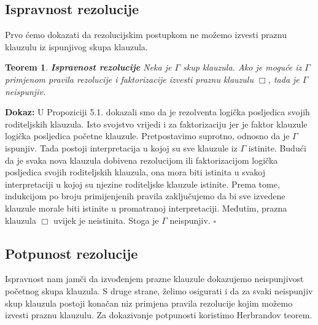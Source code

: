 \documentclass{article}
\theoremstyle{definition}
\theoremstyle{plain}
\newtheorem{teo}{Teorem}[section]
\begin{document}
\subsection*{Ispravnost rezolucije}
Prvo ćemo dokazati da rezolucijskim postupkom ne možemo izvesti praznu klauzulu iz ispunjivog skupa klauzula.

\begin{teo} \textbf{Ispravnost rezolucije}\newline
Neka je $\Gamma$ skup klauzula. Ako je moguće iz $\Gamma$ primjenom pravila rezolucije i faktorizacije izvesti praznu klauzulu $\Box$, tada je $\Gamma$ neispunjiv.
\end{teo}

\textbf{Dokaz:}\newline
U Propoziciji 5.1. dokazali smo da je rezolventa logička posljedica svojih roditeljskih klauzula. Isto svojstvo vrijedi i za faktorizaciju jer je faktor klauzule logička posljedica početne klauzule.
Pretpostavimo suprotno, odnosno da je $\Gamma$ ispunjiv. Tada postoji interpretacija u kojoj su sve klauzule iz $\Gamma$ istinite.
Budući da je svaka nova klauzula dobivena rezolucijom ili faktorizacijom logička posljedica svojih roditeljskih klauzula, ona mora biti istinita u svakoj interpretaciji u kojoj su njezine roditeljske klauzule istinite.
Prema tome, indukcijom po broju primijenjenih pravila zaključujemo da bi sve izvedene klauzule morale biti istinite u promatranoj interpretaciji.
Međutim, prazna klauzula $\Box$ uvijek je neistinita.
Stoga je $\Gamma$ neispunjiv. $\square$

\subsection*{Potpunost rezolucije}
Ispravnost nam jamči da izvođenjem prazne klauzule dokazujemo neispunjivost početnog skupa klauzula. S druge strane, želimo osigurati i da za svaki neispunjiv skup klauzula postoji konačan niz primjena pravila rezolucije kojim možemo izvesti praznu klauzulu. Za dokazivanje potpunosti koristimo Herbrandov teorem.
\end{document}
